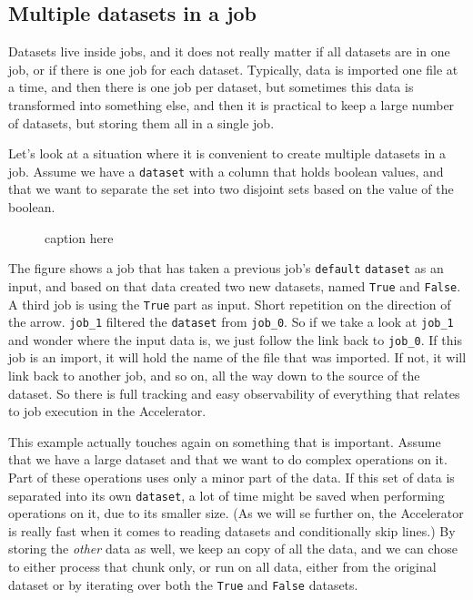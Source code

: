 \documentclass[a4paper]{article}
\begin{document}
\subsection{Multiple datasets in a job}
Datasets live inside jobs, and it does not really matter if all
datasets are in one job, or if there is one job for each dataset.
Typically, data is imported one file at a time, and then there is one
job per dataset, but sometimes this data is transformed into something
else, and then it is practical to keep a large number of datasets, but
storing them all in a single job.

Let's look at a situation where it is convenient to create multiple
datasets in a job.  Assume we have a \texttt{dataset} with a column
that holds boolean values, and that we want to separate the set into
two disjoint sets based on the value of the boolean.

\begin{figure}[h!]
  \begin{center}
    
    \caption{caption here}
    \label{fig:dep_dataset_csvimport_chain}
  \end{center}
\end{figure}

The figure shows a job that has taken a previous job's
\texttt{default} \texttt{dataset} as an input, and based on that data
created two new datasets, named \texttt{True} and \texttt{False}.  A
third job is using the \texttt{True} part as input.  Short repetition
on the direction of the arrow.  \texttt{job\_1} filtered the
\texttt{dataset} from \texttt{job\_0}.  So if we take a look at
\texttt{job\_1} and wonder where the input data is, we just follow the
link back to \texttt{job\_0}.  If this job is an import, it will hold
the name of the file that was imported.  If not, it will link back to
another job, and so on, all the way down to the source of the dataset.
So there is full tracking and easy observability of everything that
relates to job execution in the Accelerator.


This example actually touches again on something that is important.
Assume that we have a large dataset and that we want to do complex
operations on it.  Part of these operations uses only a minor part of
the data.  If this set of data is separated into its own
\texttt{dataset}, a lot of time might be saved when performing
operations on it, due to its smaller size.  (As we will se further on,
the Accelerator is really fast when it comes to reading datasets and
conditionally skip lines.)  By storing the \textsl{other} data as
well, we keep an copy of all the data, and we can chose to either
process that chunk only, or run on all data, either from the original
dataset or by iterating over both the \texttt{True} and \texttt{False}
datasets.
\end{document}
